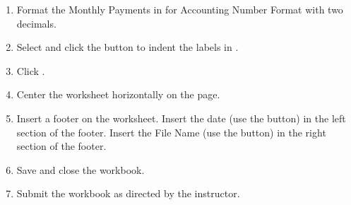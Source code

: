 \begin{enumbox}
\begin{enumerate}
		\item Format the Monthly Payments in  for Accounting Number Format with two decimals.
		
		\item Select  and click the  button to indent the labels in .
		
		\item Click .
		
		\item Center the  worksheet horizontally on the page.
		
		\item Insert a footer on the  worksheet. Insert the date (use the  button) in the left section of the footer. Insert the File Name (use the  button) in the right section of the footer.
		\item Save and close the  workbook.
		\item Submit the  workbook as directed by the instructor.
	\end{enumerate}
\end{enumbox}